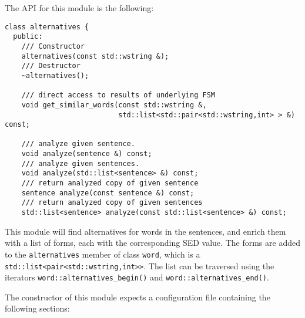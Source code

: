 \documentclass[a4paper]{book}
\begin{document}
  The API for this module is the following:

\begin{verbatim}
class alternatives {
  public:
    /// Constructor
    alternatives(const std::wstring &);
    /// Destructor
    ~alternatives();

    /// direct access to results of underlying FSM
    void get_similar_words(const std::wstring &, 
                           std::list<std::pair<std::wstring,int> > &) const;
    
    /// analyze given sentence.
    void analyze(sentence &) const;
    /// analyze given sentences.
    void analyze(std::list<sentence> &) const;
    /// return analyzed copy of given sentence
    sentence analyze(const sentence &) const;
    /// return analyzed copy of given sentences
    std::list<sentence> analyze(const std::list<sentence> &) const;
\end{verbatim}

  This module will find alternatives for words in the sentences, and enrich
 them with a list of forms, each with the corresponding SED value.
  The forms are added to the \texttt{alternatives} member of class \texttt{word},
 which is a \texttt{std::list<pair<std::wstring,int>>}.  The list can
 be traversed using the iterators \texttt{word::alternatives\_begin()} and
 \texttt{word::alternatives\_end()}.

  The constructor of this module expects a configuration file
 containing the following sections:
\end{document}

